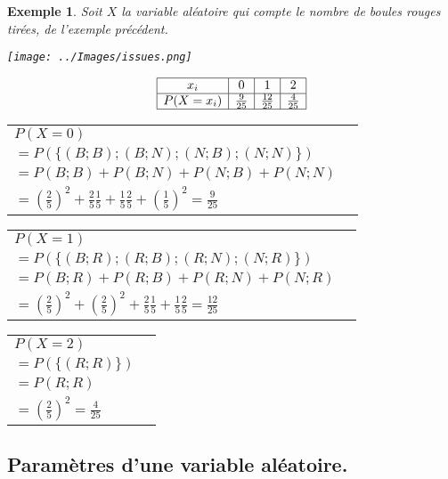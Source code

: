 \documentclass[a4paper,11pt]{article}
\theoremstyle{break}
\newcounter{enonce}
\newtheorem{exemple}[enonce]{Exemple}
\renewcommand\arraystretch{1.3}
\renewcommand\arraystretch{1.8}
\begin{document}
    \begin{exemple}
    Soit $X$ la variable aléatoire qui compte le nombre de boules rouges tirées, de l'exemple précédent.

    \begin{multicols}{2} 
 
 \texttt{[image: ../Images/issues.png]}
 
 \renewcommand{\arraystretch}{2.2}
 $$
\begin{array}{|c|c|c|c|}

\hline
    x_i&0&1&2\\
    \hline
    P(X=x_i)&\frac{9}{25}&\frac{12}{25}&\frac{4}{25}\\
    \hline
    \end{array} 
$$  
 
\columnbreak 
 
 \small 
\begin{tabular}{ll}
    $P(X=0)$\\
    $=P(\lbrace(B;B);(B;N);(N;B);(N;N)\rbrace)$ \\
    $=P(B;B)+P(B;N)+P(N;B)+P(N;N)$\\
    $=(\frac{2}{5})^2+\frac{2}{5}\frac{1}{5}+\frac{1}{5}\frac{2}{5}+(\frac{1}{5})^2=\frac{9}{25}$\\
    \end{tabular}
    
\begin{tabular}{ll}
    $P(X=1)$\\
    $=P(\lbrace(B;R);(R;B);(R;N);(N;R)\rbrace)$ \\
    $=P(B;R)+P(R;B)+P(R;N)+P(N;R)$\\
    $=(\frac{2}{5})^2+(\frac{2}{5})^2+\frac{2}{5}\frac{1}{5}+\frac{1}{5}\frac{2}{5}=\frac{12}{25}$\\
    \end{tabular} 
    
\begin{tabular}{ll}
    $P(X=2)$\\
    $=P(\lbrace(R;R)\rbrace)$ \\
    $=P(R;R)$\\
    $=(\frac{2}{5})^2=\frac{4}{25}$\\
    \end{tabular} 


  
 
\end{multicols}
\end{exemple}

\subsection{Paramètres d'une variable aléatoire.}
               
\end{document}
